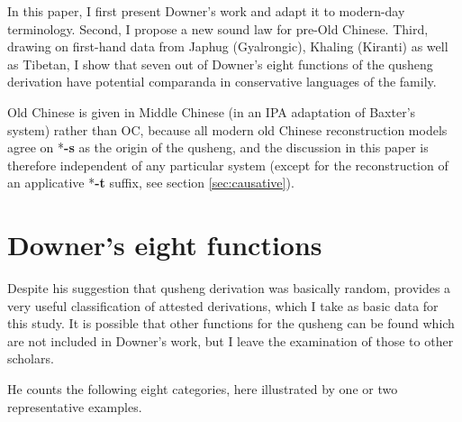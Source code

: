 \documentclass[oneside,a4paper,11pt]{article}
\newcommand{\ipa}[1]{{\phon\textbf{\mbox{#1}}}}
\begin{document}
In this paper, I first present Downer's work and adapt it to modern-day terminology. Second, I propose a new sound law for pre-Old Chinese. Third, drawing on first-hand data from Japhug (Gyalrongic), Khaling (Kiranti) as well as Tibetan, I show that seven out of Downer's eight functions of the qusheng derivation have potential comparanda in conservative languages of the family.

Old Chinese is given in Middle Chinese (in an IPA adaptation of Baxter's \citeyear{baxter92} system) rather than OC, because all modern old Chinese reconstruction models agree on *\ipa{-s} as the origin of the qusheng, and the discussion in this paper is therefore independent of any particular system (except for the reconstruction of an applicative *\ipa{-t} suffix, see section \ref{sec:causative}).

\section{Downer's eight functions}
Despite his suggestion that qusheng derivation was basically random, \citet{downer59} provides a very useful classification of attested derivations, which I take as basic data for this study. It is possible that other functions for the qusheng can be found which are not included in Downer's work, but I leave the examination of those to other scholars.

He counts the following eight categories, here illustrated by one or two representative examples.
\end{document}
